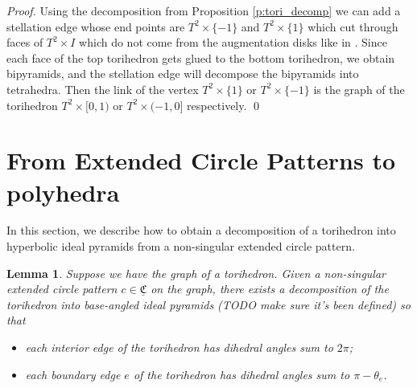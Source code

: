 \documentclass[11pt]{amsart}
\newcommand{\CCC}{{\underline{\mathfrak{C}}}}
\theoremstyle{plain}
\newtheorem{lemma}[theorem]{Lemma}
\theoremstyle{definition}
\begin{document}
{\it Proof.}  Using the decomposition from Proposition
\ref{p:tori_decomp} we can add a stellation edge whose end points
are $T^2 \times \{-1\}$ and $T^2 \times \{1\}$ which cut through faces of $T^2
\times I$ which do not come from the augmentation disks like in \cite{CKP2}.
Since each face of the top torihedron gets glued to the bottom torihedron, we
obtain bipyramids, and the stellation edge will decompose the bipyramids into
tetrahedra. Then the link of the vertex  $T^2 \times \{1\}$ or $T^2 \times
\{-1\}$ is the graph of the torihedron $T^2 \times [0,1)$ or $T^2 \times (-1,0]$
respectively. \qed



\section{From Extended Circle Patterns to polyhedra}

In this section, we describe how to obtain a
decomposition of a torihedron
into hyperbolic ideal pyramids
from a non-singular extended circle pattern.

\begin{lemma}
Suppose we have the graph of a torihedron.
Given a non-singular extended circle pattern $c \in \CCC$ on the graph,
there exists a decomposition of the torihedron
into base-angled ideal pyramids (TODO make sure it's been defined) so that
	\begin{itemize}
		\item each interior edge of the torihedron has dihedral angles sum to $2\pi$;
		\item each boundary edge $e$ of the torihedron has dihedral angles sum to
			$\pi - \theta_e$.
	\end{itemize}
\end{lemma}
\end{document}
